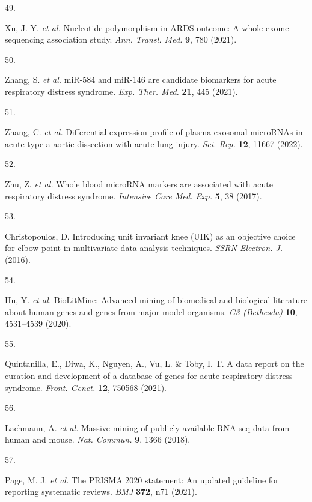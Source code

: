 \documentclass[
  11,
  a4paper,
]{article}
\newlength{\cslhangindent}
\newlength{\csllabelwidth}
\newlength{\cslentryspacingunit} %
\newenvironment{CSLReferences}[2] %
 {%
  \setlength{\parindent}{0pt}
  \ifodd #1
  \let\oldpar\par
  \def\par{\hangindent=\cslhangindent\oldpar}
  \fi
  \setlength{\parskip}{#2\cslentryspacingunit}
 }%
 {}
\newcommand{\CSLLeftMargin}[1]{\parbox[t]{\csllabelwidth}{#1}}
\newcommand{\CSLRightInline}[1]{\parbox[t]{\linewidth - \csllabelwidth}{#1}\break}
\begin{document}
\begin{CSLReferences}{0}{0}
\leavevmode{}%
\CSLLeftMargin{49. }%
\CSLRightInline{Xu, J.-Y. \emph{et al.} Nucleotide polymorphism in
{ARDS} outcome: A whole exome sequencing association study. \emph{Ann.
Transl. Med.} \textbf{9}, 780 (2021).}

\leavevmode{}%
\CSLLeftMargin{50. }%
\CSLRightInline{Zhang, S. \emph{et al.} miR-584 and miR-146 are
candidate biomarkers for acute respiratory distress syndrome. \emph{Exp.
Ther. Med.} \textbf{21}, 445 (2021).}

\leavevmode{}%
\CSLLeftMargin{51. }%
\CSLRightInline{Zhang, C. \emph{et al.} Differential expression profile
of plasma exosomal {microRNAs} in acute type a aortic dissection with
acute lung injury. \emph{Sci. Rep.} \textbf{12}, 11667 (2022).}

\leavevmode{}%
\CSLLeftMargin{52. }%
\CSLRightInline{Zhu, Z. \emph{et al.} Whole blood {microRNA} markers are
associated with acute respiratory distress syndrome. \emph{Intensive
Care Med. Exp.} \textbf{5}, 38 (2017).}

\leavevmode{}%
\CSLLeftMargin{53. }%
\CSLRightInline{Christopoulos, D. Introducing unit invariant knee
({UIK}) as an objective choice for elbow point in multivariate data
analysis techniques. \emph{SSRN Electron. J.} (2016).}

\leavevmode{}%
\CSLLeftMargin{54. }%
\CSLRightInline{Hu, Y. \emph{et al.} {BioLitMine}: Advanced mining of
biomedical and biological literature about human genes and genes from
major model organisms. \emph{G3 (Bethesda)} \textbf{10}, 4531--4539
(2020).}

\leavevmode{}%
\CSLLeftMargin{55. }%
\CSLRightInline{Quintanilla, E., Diwa, K., Nguyen, A., Vu, L. \& Toby,
I. T. A data report on the curation and development of a database of
genes for acute respiratory distress syndrome. \emph{Front. Genet.}
\textbf{12}, 750568 (2021).}

\leavevmode{}%
\CSLLeftMargin{56. }%
\CSLRightInline{Lachmann, A. \emph{et al.} Massive mining of publicly
available {RNA-seq} data from human and mouse. \emph{Nat. Commun.}
\textbf{9}, 1366 (2018).}

\leavevmode{}%
\CSLLeftMargin{57. }%
\CSLRightInline{Page, M. J. \emph{et al.} The {PRISMA} 2020 statement:
An updated guideline for reporting systematic reviews. \emph{BMJ}
\textbf{372}, n71 (2021).}


\end{CSLReferences}
\end{document}
